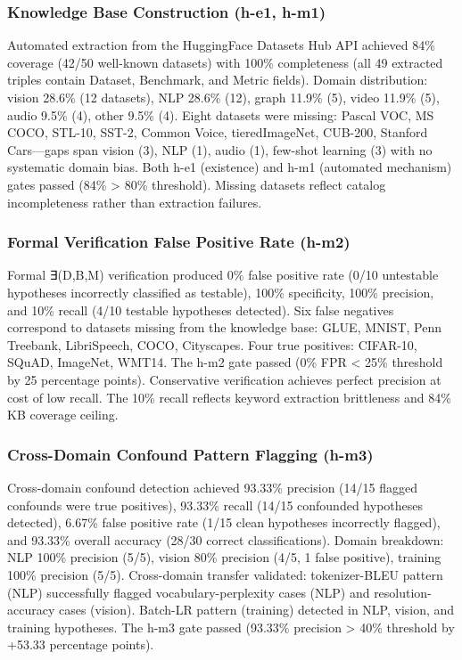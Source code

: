 
\subsubsection{Knowledge Base Construction (h-e1, h-m1)}

Automated extraction from the HuggingFace Datasets Hub API achieved 84\% coverage (42/50 well-known datasets) with 100\% completeness (all 49 extracted triples contain Dataset, Benchmark, and Metric fields). Domain distribution: vision 28.6\% (12 datasets), NLP 28.6\% (12), graph 11.9\% (5), video 11.9\% (5), audio 9.5\% (4), other 9.5\% (4). Eight datasets were missing: Pascal VOC, MS COCO, STL-10, SST-2, Common Voice, tieredImageNet, CUB-200, Stanford Cars---gaps span vision (3), NLP (1), audio (1), few-shot learning (3) with no systematic domain bias. Both h-e1 (existence) and h-m1 (automated mechanism) gates passed (84\% > 80\% threshold). Missing datasets reflect catalog incompleteness rather than extraction failures.

\subsubsection{Formal Verification False Positive Rate (h-m2)}

Formal ∃(D,B,M) verification produced 0\% false positive rate (0/10 untestable hypotheses incorrectly classified as testable), 100\% specificity, 100\% precision, and 10\% recall (4/10 testable hypotheses detected). Six false negatives correspond to datasets missing from the knowledge base: GLUE, MNIST, Penn Treebank, LibriSpeech, COCO, Cityscapes. Four true positives: CIFAR-10, SQuAD, ImageNet, WMT14. The h-m2 gate passed (0\% FPR < 25\% threshold by 25 percentage points). Conservative verification achieves perfect precision at cost of low recall. The 10\% recall reflects keyword extraction brittleness and 84\% KB coverage ceiling.

\subsubsection{Cross-Domain Confound Pattern Flagging (h-m3)}

Cross-domain confound detection achieved 93.33\% precision (14/15 flagged confounds were true positives), 93.33\% recall (14/15 confounded hypotheses detected), 6.67\% false positive rate (1/15 clean hypotheses incorrectly flagged), and 93.33\% overall accuracy (28/30 correct classifications). Domain breakdown: NLP 100\% precision (5/5), vision 80\% precision (4/5, 1 false positive), training 100\% precision (5/5). Cross-domain transfer validated: tokenizer-BLEU pattern (NLP) successfully flagged vocabulary-perplexity cases (NLP) and resolution-accuracy cases (vision). Batch-LR pattern (training) detected in NLP, vision, and training hypotheses. The h-m3 gate passed (93.33\% precision > 40\% threshold by +53.33 percentage points).


